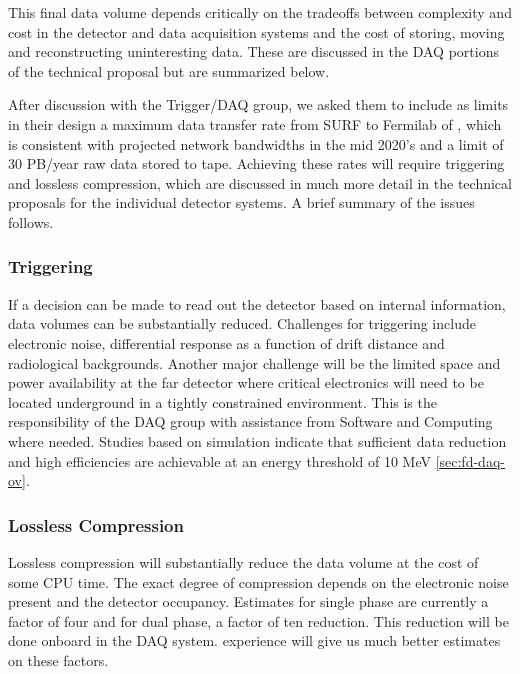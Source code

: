 This final data volume depends critically on the tradeoffs between complexity and cost in the detector and data acquisition systems and the cost of storing, moving and reconstructing uninteresting data.  These are discussed in the DAQ portions of the technical proposal but are summarized below. 

After discussion with the Trigger/DAQ group, we asked them to include as limits in their design a  maximum data transfer rate from SURF to Fermilab of \surffnalbw, which is consistent with projected network bandwidths in the mid 2020's and a limit of 30 PB/year raw data stored to tape.  Achieving these rates will require triggering and lossless compression, which are discussed in much more detail in the technical proposals for the individual detector systems.  A brief summary of the issues follows.  

\subsubsection{Triggering}

If a decision can be made to read  out the detector based on internal information, data volumes can be substantially reduced.  
Challenges for triggering include electronic noise, differential response as a function of drift distance and radiological backgrounds.
Another major challenge will be the limited space and power availability at the far detector where critical electronics will need to be located underground in a tightly constrained environment.  This is the responsibility of the DAQ group with assistance from Software and Computing where needed. Studies based on simulation indicate that  sufficient data reduction and high efficiencies are achievable at an energy threshold of 10 MeV \ref{sec:fd-daq-ov}.  

\subsubsection{Lossless Compression}

Lossless compression will substantially reduce the data volume at the cost of some CPU time.  The exact degree of compression  depends on the electronic noise present and the detector occupancy.  Estimates for single phase are currently a factor of four and for dual phase, a factor of ten reduction.  This reduction will be done onboard in the DAQ system.   experience will give us much better estimates on these factors.



